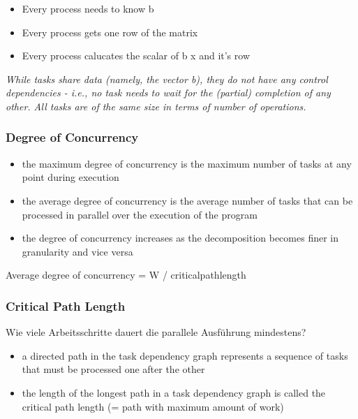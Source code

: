 \begin{itemize}
\tightlist
\item
  Every process needs to know b
\item
  Every process gets one row of the matrix
\item
  Every process calucates the scalar of b x and it's row
\end{itemize}

\textit{While tasks share data (namely, the vector b), they do not have
any control dependencies - i.e., no task needs to wait for the (partial)
completion of any other. All tasks are of the same size in terms of
number of operations.}

\hypertarget{degree-of-concurrency}{%
\subsubsection{Degree of Concurrency}\label{degree-of-concurrency}}

\begin{itemize}
\tightlist
\item
  the maximum degree of concurrency is the maximum number of tasks at
  any point during execution
\item
  the average degree of concurrency is the average number of tasks that
  can be processed in parallel over the execution of the program
\item
  the degree of concurrency increases as the decomposition becomes finer
  in granularity and vice versa
\end{itemize}

\begin{tcolorbox}[colback=red!5!white,colframe=red!75!black]
Average degree of concurrency = W / criticalpathlength
\end{tcolorbox}

\hypertarget{critical-path-length}{%
\subsubsection{Critical Path Length}\label{critical-path-length}}

Wie viele Arbeitsschritte dauert die parallele Ausführung mindestens?

\begin{itemize}
\tightlist
\item
  a directed path in the task dependency graph represents a sequence of
  tasks that must be processed one after the other
\item
  the length of the longest path in a task dependency graph is called
  the critical path length (= path with maximum amount of work)
\end{itemize}


